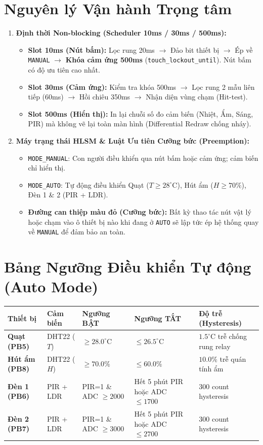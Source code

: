 \documentclass[11pt,a4paper]{article}
\begin{document}
\section{Nguyên lý Vận hành Trọng tâm}
\begin{enumerate}
    \item \textbf{Định thời Non-blocking (Scheduler 10ms / 30ms / 500ms):}
    \begin{itemize}
        \item \textbf{Slot 10ms (Nút bấm):} Lọc rung 20ms $\to$ Đảo bit thiết bị $\to$ Ép về \texttt{MANUAL} $\to$ \textbf{Khóa cảm ứng 500ms} (\texttt{touch\_lockout\_until}). Nút bấm có độ ưu tiên cao nhất.
        \item \textbf{Slot 30ms (Cảm ứng):} Kiểm tra khóa 500ms $\to$ Lọc rung 2 mẫu liên tiếp (60ms) $\to$ Hồi chiêu 350ms $\to$ Nhận diện vùng chạm (Hit-test).
        \item \textbf{Slot 500ms (Hiển thị):} In lại chuỗi số đo cảm biến (Nhiệt, Ẩm, Sáng, PIR) mà không vẽ lại toàn màn hình (Differential Redraw chống nháy).
    \end{itemize}

    \item \textbf{Máy trạng thái HLSM \& Luật Ưu tiên Cưỡng bức (Preemption):}
    \begin{itemize}
        \item \texttt{MODE\_MANUAL}: Con người điều khiển qua nút bấm hoặc cảm ứng; cảm biến chỉ hiển thị.
        \item \texttt{MODE\_AUTO}: Tự động điều khiển Quạt ($T \ge 28^\circ\text{C}$), Hút ẩm ($H \ge 70\%$), Đèn 1 \& 2 (PIR + LDR).
        \item \textbf{Đường can thiệp màu đỏ (Cưỡng bức):} Bất kỳ thao tác nút vật lý hoặc chạm vào ô thiết bị nào khi đang ở \texttt{AUTO} sẽ lập tức ép hệ thống quay về \texttt{MANUAL} để đảm bảo an toàn.
    \end{itemize}
\end{enumerate}

\section{Bảng Ngưỡng Điều khiển Tự động (Auto Mode)}
\begin{table}[H]
\centering
\small
\begin{tabular}{@{}lllll@{}}
\toprule
\textbf{Thiết bị} & \textbf{Cảm biến} & \textbf{Ngưỡng BẬT} & \textbf{Ngưỡng TẮT} & \textbf{Độ trễ (Hysteresis)} \\ \midrule
\textbf{Quạt (PB5)} & DHT22 ($T$) & $\ge 28.0^\circ\text{C}$ & $\le 26.5^\circ\text{C}$ & $1.5^\circ\text{C}$ trễ chống rung relay \\
\textbf{Hút ẩm (PB8)} & DHT22 ($H$) & $\ge 70.0\%$ & $\le 60.0\%$ & $10.0\%$ trễ quán tính ẩm \\
\textbf{Đèn 1 (PB6)} & PIR + LDR & PIR=1 \& ADC $\ge 2000$ & Hết 5 phút PIR hoặc ADC $\le 1700$ & 300 count hysteresis \\
\textbf{Đèn 2 (PB7)} & PIR + LDR & PIR=1 \& ADC $\ge 3000$ & Hết 5 phút PIR hoặc ADC $\le 2700$ & 300 count hysteresis \\ \bottomrule
\end{tabular}
\end{table}
\end{document}
